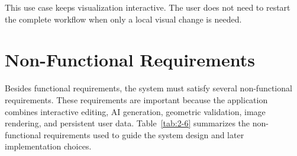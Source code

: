 This use case keeps visualization interactive. The user does not need to restart the complete workflow when only a local visual change is needed.

\section{Non-Functional Requirements}\label{sec:non-functional-requirements}

Besides functional requirements, the system must satisfy several non-functional requirements. These requirements are important because the application combines interactive editing, AI generation, geometric validation, image rendering, and persistent user data. Table~\ref{tab:2-6} summarizes the non-functional requirements used to guide the system design and later implementation choices.


